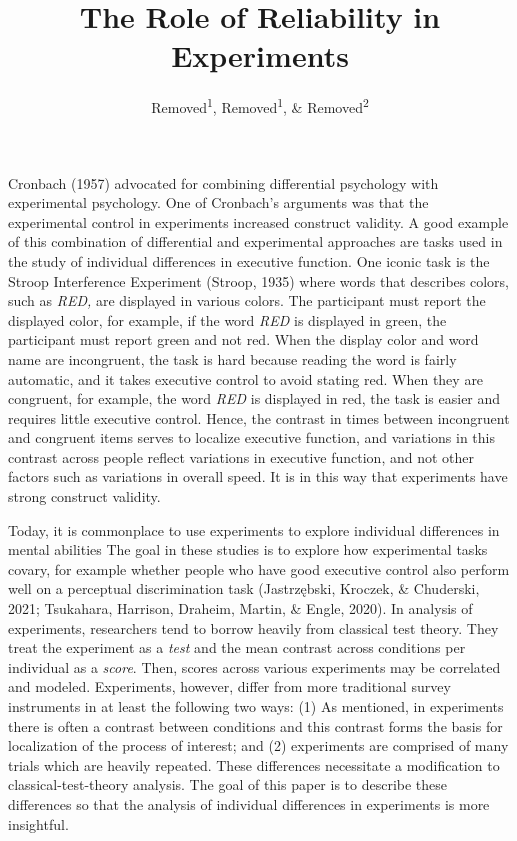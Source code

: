 \documentclass[
  ,man]{apa6}
\title{The Role of Reliability in Experiments}
\author{Removed\textsuperscript{1}, Removed\textsuperscript{1}, \& Removed\textsuperscript{2}}
\date{}
\affiliation{\vspace{0.5cm}\textsuperscript{1} Removed\\\textsuperscript{2} Removed}
\begin{document}
\maketitle

Cronbach (1957) advocated for combining differential psychology with experimental psychology. One of Cronbach's arguments was that the experimental control in experiments increased construct validity. A good example of this combination of differential and experimental approaches are tasks used in the study of individual differences in executive function. One iconic task is the Stroop Interference Experiment (Stroop, 1935) where words that describes colors, such as \emph{RED,} are displayed in various colors. The participant must report the displayed color, for example, if the word \emph{RED} is displayed in green, the participant must report green and not red. When the display color and word name are incongruent, the task is hard because reading the word is fairly automatic, and it takes executive control to avoid stating red. When they are congruent, for example, the word \emph{RED} is displayed in red, the task is easier and requires little executive control. Hence, the contrast in times between incongruent and congruent items serves to localize executive function, and variations in this contrast across people reflect variations in executive function, and not other factors such as variations in overall speed. It is in this way that experiments have strong construct validity.

Today, it is commonplace to use experiments to explore individual differences in mental abilities The goal in these studies is to explore how experimental tasks covary, for example whether people who have good executive control also perform well on a perceptual discrimination task (Jastrzębski, Kroczek, \& Chuderski, 2021; Tsukahara, Harrison, Draheim, Martin, \& Engle, 2020). In analysis of experiments, researchers tend to borrow heavily from classical test theory. They treat the experiment as a \emph{test} and the mean contrast across conditions per individual as a \emph{score}. Then, scores across various experiments may be correlated and modeled. Experiments, however, differ from more traditional survey instruments in at least the following two ways: (1) As mentioned, in experiments there is often a contrast between conditions and this contrast forms the basis for localization of the process of interest; and (2) experiments are comprised of many trials which are heavily repeated. These differences necessitate a modification to classical-test-theory analysis. The goal of this paper is to describe these differences so that the analysis of individual differences in experiments is more insightful.
\end{document}
